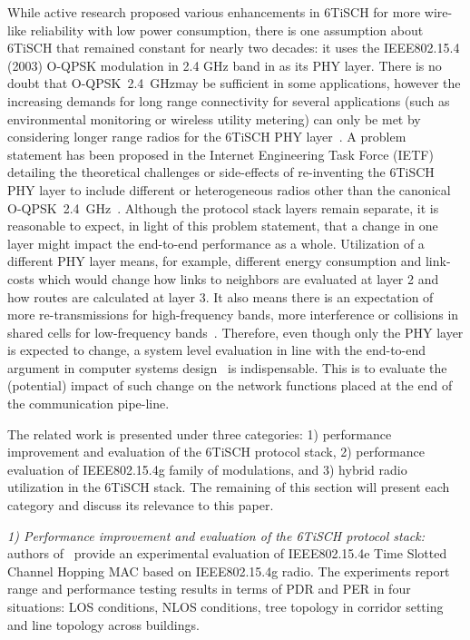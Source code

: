 \documentclass[sensors,article,submit,moreauthors,pdftex]{Definitions/mdpi}
\newcommand{\oqpsk}        {O-QPSK~2.4~GHz}
\begin{document}
While active research proposed various enhancements in 6TiSCH  for more wire-like reliability with low power consumption, there is one assumption about 6TiSCH that remained constant for nearly two decades: it uses the IEEE802.15.4 (2003) O-QPSK modulation in 2.4 GHz band in as its PHY layer. 
There is no doubt that \oqpsk may be sufficient in some applications, however the increasing demands for long range connectivity for several applications (such as environmental monitoring or wireless utility metering) can only be met by considering longer range radios for the 6TiSCH PHY layer~\cite{munoz18evaluationa}.
A problem statement has been proposed in the Internet Engineering Task Force (IETF) detailing the theoretical challenges or side-effects of re-inventing the 6TiSCH PHY layer to include different or heterogeneous radios other than the canonical \oqpsk~\cite{draft-munoz-6tisch-multi-phy-nodes}. 
Although the protocol stack layers remain separate, it is reasonable to expect, in light of this problem statement, that a change in one layer might impact the end-to-end performance as a whole. 
Utilization of a different PHY layer means, for example, different energy consumption and link-costs which would change how links to neighbors are evaluated at layer 2 and how routes are calculated at layer 3.
It also means there is an expectation of more re-transmissions for high-frequency bands, more interference or collisions in shared cells for low-frequency bands~\cite{kim15hybrid}.
Therefore, even though only the PHY layer is expected to change, a system level evaluation in line with the end-to-end argument in computer systems design~\cite{saltzer84endtoend} is indispensable.
This is to evaluate the (potential) impact of such change on the network functions placed at the end of the communication pipe-line. 


The related work is presented under three categories: 
    1) performance improvement and evaluation of the 6TiSCH protocol stack,
    2) performance evaluation of IEEE802.15.4g family of modulations, and
    3) hybrid radio utilization in the 6TiSCH stack. 
The remaining of this section will present each category and discuss its relevance to this paper.


\textit{1) Performance improvement and evaluation of the 6TiSCH protocol stack:} authors of~\cite{sum17experimental} provide an experimental evaluation of IEEE802.15.4e Time Slotted Channel Hopping MAC based on IEEE802.15.4g radio.
The experiments report range and performance testing results in terms of PDR and PER in four situations: LOS conditions, NLOS conditions, tree topology in corridor setting and line topology across buildings.
\end{document}
